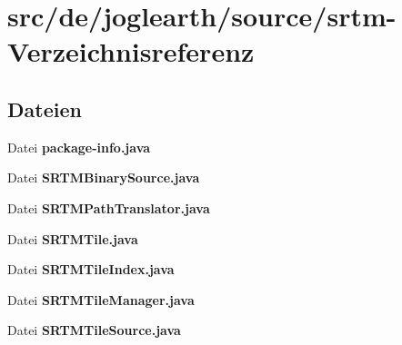 \section{src/de/joglearth/source/srtm-\/\-Verzeichnisreferenz}
\label{dir_2979b61434c925fddf7f2a458e4f80a3}
\subsection*{Dateien}
\begin{DoxyCompactItemize}
\item 
Datei {\bfseries package-\/info.\-java}
\item 
Datei {\bfseries S\-R\-T\-M\-Binary\-Source.\-java}
\item 
Datei {\bfseries S\-R\-T\-M\-Path\-Translator.\-java}
\item 
Datei {\bfseries S\-R\-T\-M\-Tile.\-java}
\item 
Datei {\bfseries S\-R\-T\-M\-Tile\-Index.\-java}
\item 
Datei {\bfseries S\-R\-T\-M\-Tile\-Manager.\-java}
\item 
Datei {\bfseries S\-R\-T\-M\-Tile\-Source.\-java}
\end{DoxyCompactItemize}
